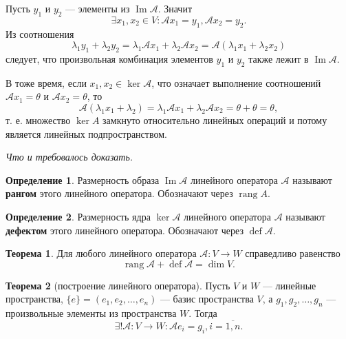 \documentclass[a5paper, 11pt]{extbook}
\theoremstyle{definition}
\newtheorem{theorem}{Теорема}[chapter]
\theoremstyle{definition}
\newtheorem{definition}{Определение}[chapter]
\newcommand{\newpar}{$ $\par\nobreak\ignorespaces}
\renewenvironment{proof}{{\noindent\bfseries Доказательство.}}{\smallskip\newpar \hfill\textit{Что и требовалось доказать.}}
\DeclareMathOperator{\rang}{rang}
\DeclareMathOperator{\Ima}{Im}
\DeclareMathOperator{\defect}{def}
\begin{document}
\begin{proof}
    Пусть \(y_1\) и \(y_2\) — элементы из \(\Ima \mathcal{A}\). Значит
    \[
        \exists x_1, x_2 \in V: \mathcal{A} x_1 = y_1, \mathcal{A} x_2 = y_2.
    \]
    Из соотношения
    \[
        \lambda_1 y_1 + \lambda_2 y_2 =
        \lambda_1 \mathcal{A} x_1 + \lambda_2 \mathcal{A} x_2 =
        \mathcal{A} (\lambda_1 x_1 + \lambda_2 x_2)
    \]
    следует, что произвольная комбинация элементов \(y_1\) и \(y_2\) также лежит в \(\Ima \mathcal{A}\).

    В тоже время, если \(x_1, x_2 \in \ker \mathcal{A}\), что означает выполнение соотношений \(\mathcal{A} x_1 = \theta\) и \(\mathcal{A} x_2 = \theta\), то
    \[
        \mathcal{A} (\lambda_1 x_1 + \lambda_2) = \lambda_1 \mathcal{A} x_1 + \lambda_2 \mathcal{A} x_2 = \theta + \theta = \theta,
    \]
    т. е. множество \(\ker A\) замкнуто относительно линейных операций и потому является линейных подпространством.
\end{proof}

\begin{definition}
    Размерность образа \(\Ima \mathcal{A}\) линейного оператора \(\mathcal{A}\) называют \textbf{рангом} этого линейного оператора. Обозначают через \(\rang A\).
\end{definition}

\begin{definition}
    Размерность ядра \(\ker \mathcal{A}\) линейного оператора \(\mathcal{A}\) называют \textbf{дефектом} этого линейного оператора. Обозначают через \(\defect \mathcal{A}\).
\end{definition}

\begin{theorem}
    Для любого линейного оператора \(\mathcal{A}: V \to W\) справедливо равенство
    \[
        \rang \mathcal{A} + \defect \mathcal{A} = \dim V.
    \]
\end{theorem}

\begin{theorem}[построение линейного оператора]
    Пусть \(V\) и \(W\) — линейные пространства, \(\{e\} = (e_1, e_2, \ldots, e_n)\) — базис пространства \(V\), а \(g_1, g_2, \ldots, g_n\) — произвольные элементы из пространства \(W\). Тогда
    \[
        \exists! \mathcal{A}: V \to W : \mathcal{A} e_i = g_i, i = \overline{1, n}.
    \]
\end{theorem}
\end{document}
